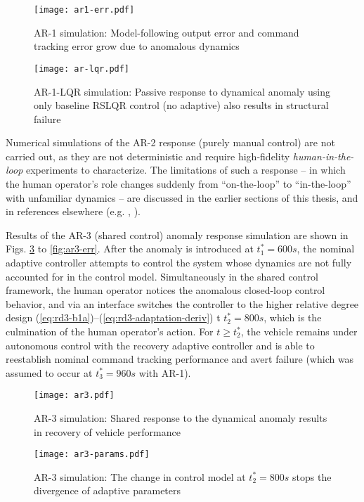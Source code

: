\begin{figure}[htbp]
	\centering
	\texttt{[image: ar1-err.pdf]}
	\caption{AR-1 simulation: Model-following output error and command tracking error grow due to anomalous dynamics}
	\label{fig:ar1-err}
\end{figure}

\begin{figure}[htbp]
	\centering
	\texttt{[image: ar-lqr.pdf]}
	\caption{AR-1-LQR simulation: Passive response to dynamical anomaly using only baseline RSLQR control (no adaptive) also results in structural failure}
	\label{fig:ar-lqr}
\end{figure}

Numerical simulations of the AR-2 response (purely manual control) are not carried out, as they are not deterministic and require high-fidelity \textit{human-in-the-loop} experiments to characterize. The limitations of such a response -- in which the human operator's role changes suddenly from ``on-the-loop'' to ``in-the-loop'' with unfamiliar dynamics -- are discussed in the earlier sections of this thesis, and in references elsewhere (e.g. \cite{endsley1996automation}, \cite{hess2015modeling}).

Results of the AR-3 (shared control) anomaly response simulation are shown in Figs. \ref{fig:ar3-sim} to \ref{fig:ar3-err}. After the anomaly is introduced at $t_1^* = 600 s$, the nominal adaptive controller attempts to control the system whose dynamics are not fully accounted for in the control model. Simultaneously in the shared control framework, the human operator notices the anomalous closed-loop control behavior, and via an interface switches the controller to the higher relative degree design (\ref{eq:rd3-b1a})--(\ref{eq:rd3-adaptation-deriv}) t $t_2^* = 800 s$, which is the culmination of the human operator's action. For $t \geq t_2^*$, the vehicle remains under autonomous control with the recovery adaptive controller and is able to reestablish nominal command tracking performance and avert failure (which was assumed to occur at $t_3^* = 960 s$ with AR-1).

\begin{figure}[htbp]
	\centering
	\texttt{[image: ar3.pdf]}
	\caption{AR-3 simulation: Shared response to the dynamical anomaly results in recovery of vehicle performance}
	\label{fig:ar3-sim}
\end{figure}

\begin{figure}[htbp]
	\centering
	\texttt{[image: ar3-params.pdf]}
	\caption{AR-3 simulation: The change in control model at $t_2^* = 800 s$ stops the divergence of adaptive parameters}
	\label{fig:ar3-params}
\end{figure}

